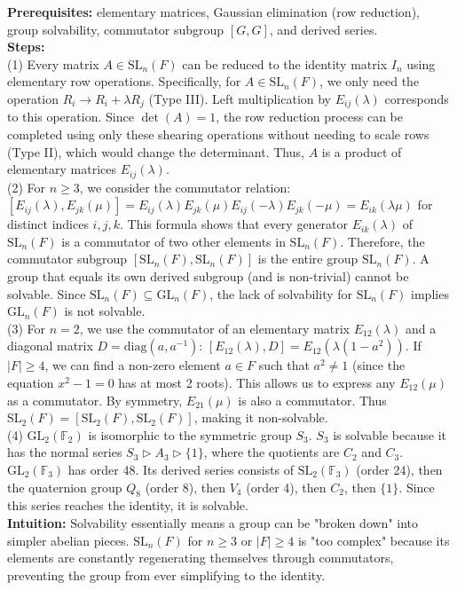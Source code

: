 \begin{solution}
\textbf{Prerequisites:} elementary matrices, Gaussian elimination (row reduction), group solvability, commutator subgroup $[G, G]$, and derived series. \\[2ex]

\textbf{Steps:} \\[2ex]
(1) Every matrix $A \in \mathrm{SL}_n(F)$ can be reduced to the identity matrix $I_n$ using elementary row operations. Specifically, for $A \in \mathrm{SL}_n(F)$, we only need the operation $R_i \to R_i + \lambda R_j$ (Type III). Left multiplication by $E_{ij}(\lambda)$ corresponds to this operation. Since $\det(A) = 1$, the row reduction process can be completed using only these shearing operations without needing to scale rows (Type II), which would change the determinant. Thus, $A$ is a product of elementary matrices $E_{ij}(\lambda)$. \\[2ex]

(2) For $n \geq 3$, we consider the commutator relation: $[E_{ij}(\lambda), E_{jk}(\mu)] = E_{ij}(\lambda)E_{jk}(\mu)E_{ij}(-\lambda)E_{jk}(-\mu) = E_{ik}(\lambda\mu)$ for distinct indices $i, j, k$. This formula shows that every generator $E_{ik}(\lambda)$ of $\mathrm{SL}_n(F)$ is a commutator of two other elements in $\mathrm{SL}_n(F)$. Therefore, the commutator subgroup $[\mathrm{SL}_n(F), \mathrm{SL}_n(F)]$ is the entire group $\mathrm{SL}_n(F)$. A group that equals its own derived subgroup (and is non-trivial) cannot be solvable. Since $\mathrm{SL}_n(F) \subseteq \mathrm{GL}_n(F)$, the lack of solvability for $\mathrm{SL}_n(F)$ implies $\mathrm{GL}_n(F)$ is not solvable. \\[2ex]

(3) For $n=2$, we use the commutator of an elementary matrix $E_{12}(\lambda)$ and a diagonal matrix $D = \text{diag}(a, a^{-1})$: 
$[E_{12}(\lambda), D] = E_{12}(\lambda(1-a^2))$. If $|F| \geq 4$, we can find a non-zero element $a \in F$ such that $a^2 \neq 1$ (since the equation $x^2-1=0$ has at most 2 roots). This allows us to express any $E_{12}(\mu)$ as a commutator. By symmetry, $E_{21}(\mu)$ is also a commutator. Thus $\mathrm{SL}_2(F) = [\mathrm{SL}_2(F), \mathrm{SL}_2(F)]$, making it non-solvable. \\[2ex]

(4) $\mathrm{GL}_2(\mathbb{F}_2)$ is isomorphic to the symmetric group $S_3$. $S_3$ is solvable because it has the normal series $S_3 \rhd A_3 \rhd \{1\}$, where the quotients are $C_2$ and $C_3$. \\[2ex]
$\mathrm{GL}_2(\mathbb{F}_3)$ has order 48. Its derived series consists of $\mathrm{SL}_2(\mathbb{F}_3)$ (order 24), then the quaternion group $Q_8$ (order 8), then $V_4$ (order 4), then $C_2$, then $\{1\}$. Since this series reaches the identity, it is solvable. \\[2ex]

\textbf{Intuition:} Solvability essentially means a group can be "broken down" into simpler abelian pieces. $\mathrm{SL}_n(F)$ for $n \geq 3$ or $|F| \geq 4$ is "too complex" because its elements are constantly regenerating themselves through commutators, preventing the group from ever simplifying to the identity.
\end{solution}

